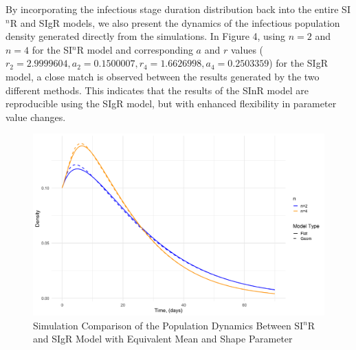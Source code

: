 \documentclass[12pt]{article}
\begin{document}
By incorporating the infectious stage duration distribution back into the entire SI$^n$R and SIgR models, we also present the dynamics of the infectious population density generated directly from the simulations. In Figure 4, using $n=2$ and $n=4$ for the SI$^n$R model and corresponding $a$ and $r$ values ( $r_2=2.9999604, a_2=0.1500007, r_4 = 1.6626998, a_4 = 0.2503359$) for the SIgR model, a close match is observed between the results generated by the two different methods. This indicates that the results of the SInR model are reproducible using the SIgR model, but with enhanced flexibility in parameter value changes.
\begin{figure}[h]
    \centering
    \includegraphics[width= \textwidth]{4.3.2.png}
    \caption{Simulation Comparison of the Population Dynamics Between SI$^n$R and SIgR Model with Equivalent Mean and Shape Parameter}
\end{figure}
\end{document}
